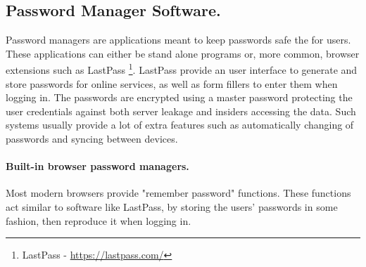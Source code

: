 \subsection{Password Manager Software.} \label{subsec:pms}
Password managers are applications meant to keep passwords safe the for users. These applications can either be stand alone programs or, more common, browser extensions such as LastPass \footnote{LastPass - \url{https://lastpass.com/}}. LastPass provide an user interface to generate and store passwords for online services, as well as form fillers to enter them when logging in. The passwords are encrypted using a master password protecting the user credentials against both server leakage and insiders accessing the data. Such systems usually provide a lot of extra features such as automatically changing of passwords and syncing between devices. 

\paragraph{Built-in browser password managers.} Most modern browsers provide "remember password" functions. These functions act similar to software like LastPass, by storing the users' passwords in some fashion, then reproduce it when logging in. 

